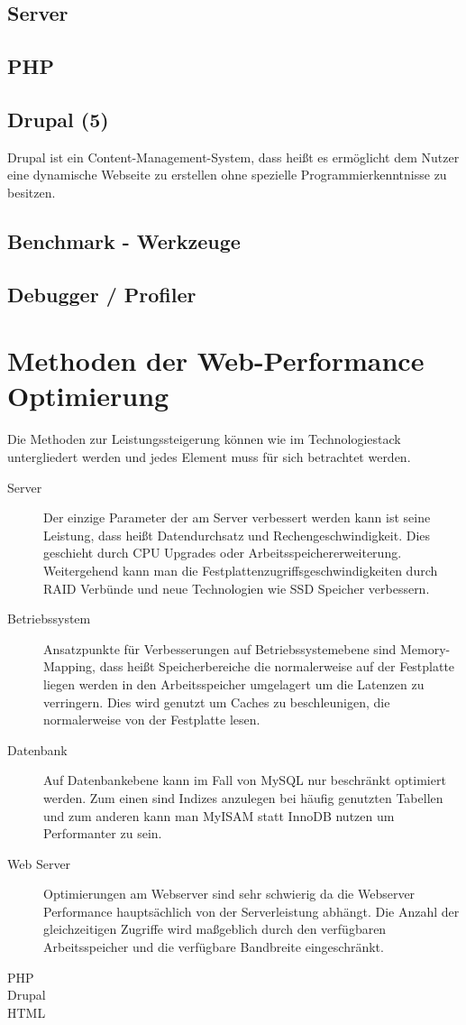 \subsection{Server}
\subsection{PHP}
\subsection{Drupal (5)}
Drupal ist ein Content-Management-System, dass heißt es ermöglicht dem Nutzer eine dynamische Webseite zu erstellen ohne spezielle Programmierkenntnisse zu besitzen. 
\subsection{Benchmark - Werkzeuge}
\subsection{Debugger / Profiler}
\section{Methoden der Web-Performance Optimierung}
Die Methoden zur Leistungssteigerung können wie im Technologiestack untergliedert werden und jedes Element muss für sich betrachtet werden.

\begin{description}
  \item[Server] Der einzige Parameter der am Server verbessert werden kann ist seine Leistung, dass heißt Datendurchsatz und Rechengeschwindigkeit. Dies geschieht durch CPU Upgrades oder Arbeitsspeichererweiterung. Weitergehend kann man die Festplattenzugriffsgeschwindigkeiten durch RAID Verbünde und neue Technologien wie SSD Speicher verbessern. 
  \item[Betriebssystem] Ansatzpunkte für Verbesserungen auf Betriebssystemebene sind Memory-Mapping, dass heißt Speicherbereiche die normalerweise auf der Festplatte liegen werden in den Arbeitsspeicher umgelagert um die Latenzen zu verringern. Dies wird genutzt um Caches zu beschleunigen, die normalerweise von der Festplatte lesen.
  \item[Datenbank] Auf Datenbankebene kann im Fall von MySQL nur beschränkt optimiert werden. Zum einen sind Indizes anzulegen bei häufig genutzten Tabellen und zum anderen kann man MyISAM statt InnoDB nutzen um Performanter zu sein.
  \item[Web Server] Optimierungen am Webserver sind sehr schwierig da die Webserver Performance hauptsächlich von der Serverleistung abhängt. Die Anzahl der gleichzeitigen Zugriffe wird maßgeblich durch den verfügbaren Arbeitsspeicher und die verfügbare Bandbreite eingeschränkt.
  \item[PHP] 
  \item[Drupal] 
  \item[HTML] 
\end{description}


%
%